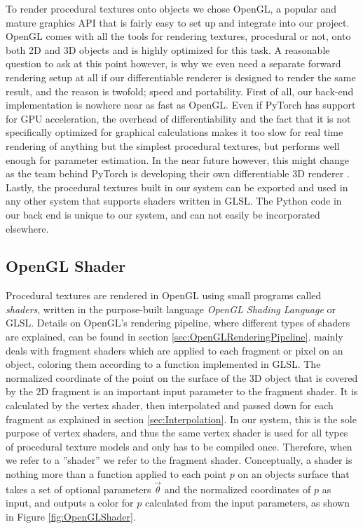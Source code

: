 To render procedural textures onto objects we chose OpenGL, a popular and mature graphics API that is fairly easy to set up and integrate into our project. OpenGL comes with all the tools for rendering textures, procedural or not, onto both 2D and 3D objects and is highly optimized for this task. A reasonable question to ask at this point however, is why we even need a separate forward rendering setup at all if our differentiable renderer is designed to render the same result, and the reason is twofold; speed and portability. First of all, our back-end implementation is nowhere near as fast as OpenGL. Even if PyTorch has support for GPU acceleration, the overhead of differentiability and the fact that it is not specifically optimized for graphical calculations makes it too slow for real time rendering of anything but the simplest procedural textures, but performs well enough for parameter estimation. In the near future however, this might change as the team behind PyTorch is developing their own differentiable 3D renderer \cite{facebookresearch_2020_facebookresearchpytorch3d}. Lastly, the procedural textures built in our system can be exported and used in any other system that supports shaders written in GLSL. The Python code in our back end is unique to our system, and can not easily be incorporated elsewhere.

\subsection{OpenGL Shader}\label{sec:MethodOpenGLShader}

Procedural textures are rendered in OpenGL using small programs called \textit{shaders}, written in the purpose-built language \textit{OpenGL Shading Language} or GLSL. Details on OpenGL's rendering pipeline, where different types of shaders are explained, can be found in section \ref{sec:OpenGLRenderingPipeline}. \dipter{} mainly deals with fragment shaders which are applied to each fragment or pixel on an object, coloring them according to a function implemented in GLSL. The normalized coordinate of the point on the surface of the 3D object that is covered by the 2D fragment is an important input parameter to the fragment shader. It is calculated by the vertex shader, then interpolated and passed down for each fragment as explained in section \ref{sec:Interpolation}. In our system, this is the sole purpose of vertex shaders, and thus the same vertex shader is used for all types of procedural texture models and only has to be compiled once. Therefore, when we refer to a ''shader'' we refer to the fragment shader. Conceptually, a shader is nothing more than a function applied to each point $p$ on an objects surface that takes a set of optional parameters $\Vec{\theta}$ and the normalized coordinates of $p$ as input, and outputs a color for $p$ calculated from the input parameters, as shown in Figure \ref{fig:OpenGLShader}.


